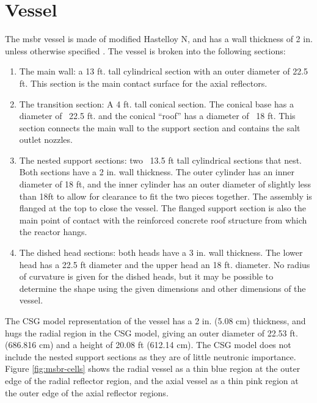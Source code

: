 \section{Vessel}
\label{sec:msbr-vessel}
The \Gls{msbr} vessel is made of modified Hastelloy N, and has a wall thickness
of 2 in. unless otherwise specified \cite{robertson_conceptual_1971}. The vessel
is broken into the following sections:
\begin{enumerate}
    \item The main wall: a 13 ft. tall cylindrical section with an outer
    diameter of 22.5 ft. This section is the main contact surface for the axial
    reflectors.
    \item The transition section: A 4 ft. tall conical section. The conical base
    has a diameter of ~22.5 ft. and the conical ``roof'' has a diameter of ~18
    ft. This section connects the main wall to the support section and contains
    the salt outlet nozzles.
    \item The nested support sections: two ~13.5 ft tall cylindrical sections
    that nest. Both sections have a 2 in. wall thickness. The outer cylinder has
    an inner diameter of 18 ft, and the inner cylinder has an outer diameter of
    slightly less than 18ft to allow for clearance to fit the two pieces
    together. The assembly is flanged at the top to close the vessel. The
    flanged support section is also the main point of contact with the
    reinforced concrete roof structure from which the reactor hangs.
    \item The dished head sections: both heads have a 3 in. wall thickness. The
    lower head has a 22.5 ft diameter and the upper head an 18 ft. diameter. No
    radius of curvature is given for the dished heads, but it may be possible to
    determine the shape using the given dimensions and other dimensions of the
    vessel.
\end{enumerate}

The CSG model representation of the vessel has a 2 in. (5.08
\unit{\centi\metre}) thickness, and hugs the radial region in the CSG model,
giving an outer diameter of 22.53 ft. (686.816 \unit{\centi\metre}) and a
height of 20.08 ft (612.14 \unit{\centi\metre}). The CSG model does not include
the nested support sections as they are of little neutronic importance. Figure
\ref{fig:msbr-cells} shows the radial vessel as a thin blue region at the outer
edge of the radial reflector region, and the axial vessel as a thin pink region
at the outer edge of the axial reflector regions.

